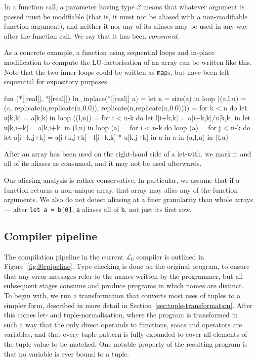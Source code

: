 \documentclass{sigplanconf}  %
\newcommand{\LO}{$\mathcal{L}_0$}
\begin{document}
In a function call, a parameter having type {\tt *$\beta$} means that
whatever argument is passed must be modifiable (that is, it must not
be aliased with a non-modifiable function argument), and neither it
nor any of its aliases may be used in any way after the function call.
We say that it has been {\em consumed}.

As a concrete example, a function using sequential loops and in-place
modification to compute the LU-factorisation of an array can be
written like this.  Note that the two inner loops could be written as
{\tt map}s, but have been left sequential for expository purposes.

\begin{colorcode}
fun (*[[real]], *[[real]]) lu_inplace(*[[real]] a) =
  let n = size(a) in
  loop ((a,l,u) =
    (a, replicate(n,replicate(n,0.0)),
        replicate(n,replicate(n,0.0)))) = for k < n do
      let u[k,k] = a[k,k] in
      loop ((l,u)) = for i < n-k do
        let l[i+k,k] = a[i+k,k]/u[k,k] in
        let u[k,i+k] = a[k,i+k] in
        (l,u) in
      loop (a) = for i < n-k do
        loop (a) = for j < n-k do
          let a[i+k,j+k] =
            a[i+k,j+k] - l[i+k,k] * u[k,j+k] in
          a in
        a in
      (a,l,u) in
  (l,u)
\end{colorcode}

After an array has been used on the right-hand side of a let-with, we
mark it and all of its aliases as consumed, and it may not be used
afterwards.

Our aliasing analysis is rather conservative.  In particular, we
assume that if a function returns a non-unique array, that array may
alias any of the function arguments.  We also do not detect aliasing
at a finer granularity than whole arrays --- after {\tt let a = b[0]},
{\tt a} aliases all of {\tt b}, not just its first row.

\subsection{Compiler pipeline}
\label{sec:compiler-pipeline}

The compilation pipeline in the current \LO{} compiler is outlined in
Figure~\ref{fig:l0cpipeline}.  Type checking is done on the original
program, to ensure that any error messages refer to the names written
by the programmer, but all subsequent stages consume and produce
programs in which names are distinct.  To begin with, we run a
transformation that converts most uses of tuples to a simpler form,
described in more detail in Section~\ref{sec:tuple-transformation}.
After this comes let- and tuple-normalisation, where the program is
transformed in such a way that the only direct operands to functions,
{\sc soac}s and operators are variables, and that every tuple-pattern
is fully expanded to cover all elements of the tuple value to be
matched.  One notable property of the resulting program is that no
variable is ever bound to a tuple.
\end{document}
